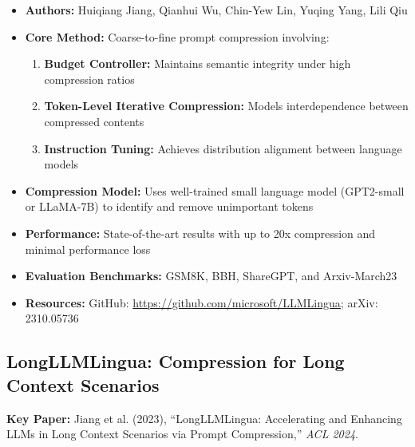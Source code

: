 \documentclass[11pt]{article}
\begin{document}
\begin{itemize}[leftmargin=*]
    \item \textbf{Authors:} Huiqiang Jiang, Qianhui Wu, Chin-Yew Lin, Yuqing Yang, Lili Qiu
    \item \textbf{Core Method:} Coarse-to-fine prompt compression involving:
    \begin{enumerate}
        \item \textbf{Budget Controller:} Maintains semantic integrity under high compression ratios
        \item \textbf{Token-Level Iterative Compression:} Models interdependence between compressed contents
        \item \textbf{Instruction Tuning:} Achieves distribution alignment between language models
    \end{enumerate}
    \item \textbf{Compression Model:} Uses well-trained small language model (GPT2-small or LLaMA-7B) to identify and remove unimportant tokens
    \item \textbf{Performance:} State-of-the-art results with up to 20x compression and minimal performance loss
    \item \textbf{Evaluation Benchmarks:} GSM8K, BBH, ShareGPT, and Arxiv-March23
    \item \textbf{Resources:} GitHub: \url{https://github.com/microsoft/LLMLingua}; arXiv: 2310.05736
\end{itemize}

\subsection{LongLLMLingua: Compression for Long Context Scenarios}

\textbf{Key Paper:} Jiang et al. (2023), ``LongLLMLingua: Accelerating and Enhancing LLMs in Long Context Scenarios via Prompt Compression,'' \textit{ACL 2024}.
\end{document}
